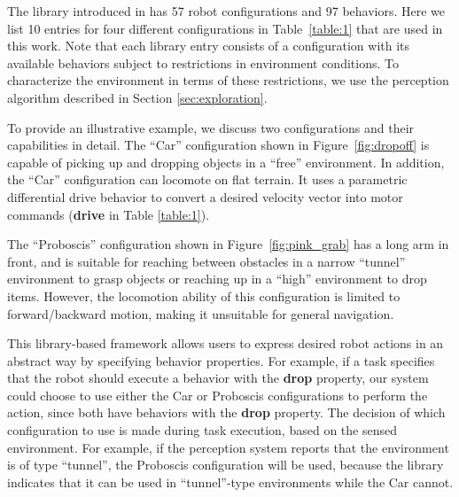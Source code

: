\documentclass[journal]{IEEEtran}
\begin{document}
The library introduced in \cite{Jing2016} has 57 robot configurations and 97 behaviors.
Here we list 10 entries for four different configurations in Table~\ref{table:1} that are used in this work.
Note that each library entry consists of a configuration with its available behaviors subject to restrictions in environment conditions. To characterize the environment in terms of these restrictions, we use the perception algorithm described in Section \ref{sec:exploration}.

To provide an illustrative example, we discuss two configurations and their capabilities in detail.
The ``Car'' configuration shown in Figure~\ref{fig:dropoff} is capable of picking
up and dropping objects in a ``free'' environment. In addition, the ``Car'' configuration can locomote on flat terrain. It uses a parametric differential drive behavior to convert a desired velocity vector into motor commands (\textbf{drive} in Table \ref{table:1}).

The ``Proboscis'' configuration shown in Figure~\ref{fig:pink_grab} has
a long arm in front, and is suitable for reaching between obstacles in a narrow ``tunnel'' environment to grasp objects or reaching up in a ``high'' environment to drop items.
However, the locomotion ability of this configuration is limited to forward/backward
motion, making it unsuitable for general navigation.

This library-based framework allows users to express desired robot actions in an abstract way by specifying behavior properties. For example, if a task specifies that the robot should execute a behavior with the \textbf{drop} property, our system could choose to use either the Car or Proboscis configurations to perform the action, since both have behaviors with the \textbf{drop} property.
The decision of which configuration to use is made during task execution, based on the sensed environment.
For example, if the perception system reports that the environment is of type ``tunnel'', the Proboscis configuration will be used, because the library indicates that it can be used in ``tunnel''-type environments while the Car cannot.
\end{document}
